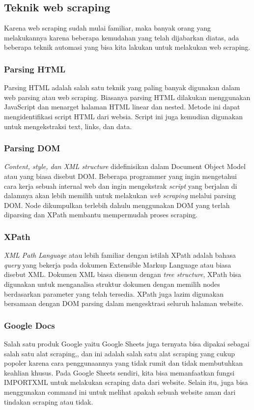 \subsection{Teknik web scraping}
Karena web scraping sudah mulai familiar, maka banyak orang yang melakukannya karena beberapa kemudahan yang telah dijabarkan diatas, ada beberapa teknik automasi yang bisa kita lakukan untuk melakukan web scraping.

\subsubsection{Parsing HTML}

Parsing HTML adalah salah satu teknik yang paling banyak digunakan dalam web parsing atau web scraping. Biasanya parsing HTML dilakukan menggunakan JavaScript dan menarget halaman HTML linear dan nested. Metode ini dapat mengidentifikasi script HTML dari websia. Script ini juga kemudian digunakan untuk mengekstraksi text, links, dan data.

\subsubsection{Parsing DOM}

\textit{Content, style, dan XML structure} didefinisikan dalam Document Object Model atau yang biasa disebut DOM. Beberapa programmer yang ingin mengetahui cara kerja sebuah internal web dan ingin mengekstrak \textit{script} yang berjalan di dalamnya akan lebih memilih untuk melakukan \textit{web scraping} melalui parsing DOM. Node dikumpulkan terlebih dahulu menggunakan DOM yang terlah diparsing dan XPath membantu mempermudah proses scraping.

\subsubsection{XPath}

\textit{XML Path Language} atau lebih familiar dengan istilah XPath adalah bahasa \textit{query} yang bekerja pada dokumen Extensible Markup Language atau biasa disebut XML. Dokumen XML biasa disusun dengan \textit{tree structure}, XPath bisa digunakan untuk menganalisa struktur dokumen dengan memilih nodes berdasarkan parameter yang telah tersedia. XPath juga lazim digunakan bersamaan dengan DOM parsing dalam mengesktrasi seluruh halaman website.

\subsubsection{Google Docs}

Salah satu produk Google yaitu Google Sheets juga ternyata bisa dipakai sebagai salah satu alat scraping,, dan ini adalah salah satu alat scraping yang cukup popoler karena cara penggunaannya yang tidak rumit dan tidak membutuhkan keahlian khusus. Pada Google Sheets sendiri, kita bisa memanfaatkan fungsi IMPORTXML untuk melakukan scraping data dari website. Selain itu, juga bisa menggunakan command ini untuk melihat apakah sebuah website aman dari tindakan scraping atau tidak.
